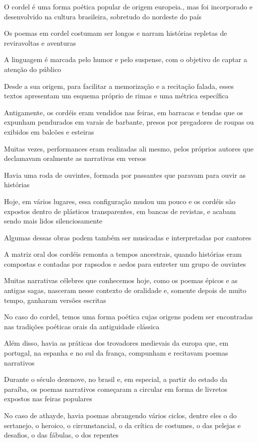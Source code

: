 \documentclass[12pt]{extarticle}
\begin{document}
O cordel é uma forma poética popular de origem europeia., mas foi incorporado e desenvolvido na cultura brasileira, sobretudo do nordeste do país

Os poemas em cordel costumam ser longos e narram histórias repletas de reviravoltas e aventuras

A linguagem é marcada pelo humor e pelo suspense, com o objetivo de captar a atenção do público

Desde a sua origem, para facilitar a memorização e a recitação falada, esses textos apresentam um esquema próprio de rimas e uma métrica específica

Antigamente, os cordéis eram vendidos nas feiras, em barracas e tendas que os expunham pendurados em varais de barbante, presos por pregadores de roupas ou exibidos em balcões e esteiras

Muitas vezes, performances eram realizadas ali mesmo, pelos próprios autores que declamavam oralmente as narrativas em versos

Havia uma roda de ouvintes, formada por passantes que paravam para ouvir as histórias

Hoje, em vários lugares, essa configuração mudou um pouco e os cordéis são expostos dentro de plásticos transparentes, em bancas de revistas, e acabam sendo mais lidos silenciosamente

Algumas dessas obras podem também ser musicadas e interpretadas por cantores

A matriz oral dos cordéis remonta a tempos ancestrais, quando histórias eram compostas e contadas por rapsodos e aedos para entreter um grupo de ouvintes

Muitas narrativas célebres que conhecemos hoje, como os poemas épicos e as antigas sagas, nasceram nesse contexto de oralidade e, somente depois de muito tempo, ganharam versões escritas

No caso do cordel, temos uma forma poética cujas origens podem ser encontradas nas tradições poéticas orais da antiguidade clássica

Além disso, havia as práticas dos trovadores medievais da europa que, em portugal, na espanha e no sul da frança, compunham e recitavam poemas narrativos

Durante o século dezenove,  no brasil e, em especial, a partir do estado da paraíba, os poemas narrativos começaram a circular em forma de livretos expostos nas feiras populares

No caso de athayde, havia poemas abrangendo vários ciclos, dentre eles o do sertanejo, o heroico, o circunstancial, o da crítica de costumes, o das pelejas e desafios, o das fábulas, o dos repentes
\end{document}
